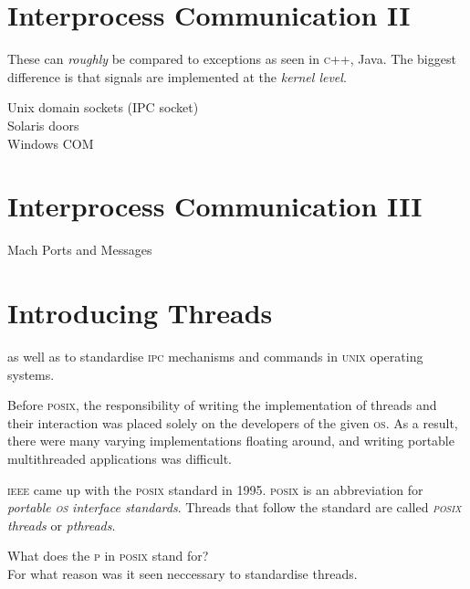 \section{Interprocess Communication II}



These can \textit{roughly} be compared to exceptions as seen in \textsc{c}++, Java.
The biggest difference is that signals are implemented at the \textit{kernel level}. 


Unix domain sockets (IPC socket) \\
Solaris doors \\
Windows COM \\


\section{Interprocess Communication III}

Mach Ports and Messages 



\section{Introducing Threads}

as well as to standardise \textsc{ipc} mechanisms and commands 
in \textsc{unix} operating systems.

Before \textsc{posix}, the responsibility of writing the
implementation of threads and their interaction was placed 
solely on the developers of the given \textsc{os}. 
As a result, there were many varying implementations floating around, 
and writing portable multithreaded applications was difficult.

\textsc{ieee} came up with the \textsc{posix} standard in 1995. 
\textsc{posix} is an abbreviation for 
\textit{portable \textsc{os} interface standards}.
Threads that follow the standard are called 
\textit{\textsc{posix} threads} or \textit{pthreads}.

\begin{example}
What does the \textsc{p} in \textsc{posix} stand for? \\
For what reason was it seen neccessary to standardise threads.
\end{example}


